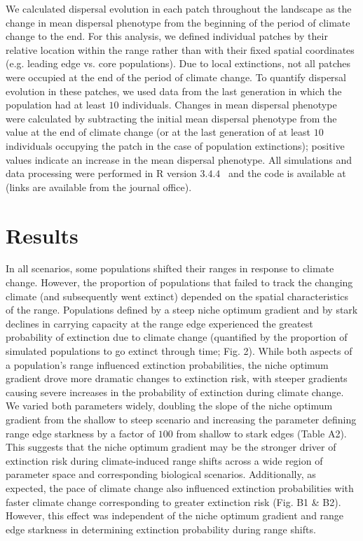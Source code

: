 \documentclass[11pt]{article}
\begin{document}
We calculated dispersal evolution in each patch throughout the landscape as the change in mean dispersal phenotype from the beginning of the period of climate change to the end. For this analysis, we defined individual patches by their relative location within the range rather than with their fixed spatial coordinates (e.g. leading edge vs. core populations). Due to local extinctions, not all patches were occupied at the end of the period of climate change. To quantify dispersal evolution in these patches, we used data from the last generation in which the population had at least $10$ individuals. Changes in mean dispersal phenotype were calculated by subtracting the initial mean dispersal phenotype from the value at the end of climate change (or at the last generation of at least $10$ individuals occupying the patch in the case of population extinctions); positive values indicate an increase in the mean dispersal phenotype. All simulations and data processing were performed in R version $3.4.4$~\citep{team2000r} and the code is available at (links are available from the journal office).

\section*{Results}
In all scenarios, some populations shifted their ranges in response to climate change. However, the proportion of populations that failed to track the changing climate (and subsequently went extinct) depended on the spatial characteristics of the range. Populations defined by a steep niche optimum gradient and by stark declines in carrying capacity at the range edge experienced the greatest probability of extinction due to climate change (quantified by the proportion of simulated populations to go extinct through time; Fig. 2). While both aspects of a population's range influenced extinction probabilities, the niche optimum gradient drove more dramatic changes to extinction risk, with steeper gradients causing severe increases in the probability of extinction during climate change. We varied both parameters widely, doubling the slope of the niche optimum gradient from the shallow to steep scenario and increasing the parameter defining range edge starkness by a factor of $100$ from shallow to stark edges (Table A2). This suggests that the niche optimum gradient may be the stronger driver of extinction risk during climate-induced range shifts across a wide region of parameter space and corresponding biological scenarios. Additionally, as expected, the pace of climate change also influenced extinction probabilities with faster climate change corresponding to greater extinction risk (Fig. B1 \& B2). However, this effect was independent of the niche optimum gradient and range edge starkness in determining extinction probability during range shifts.
\end{document}
